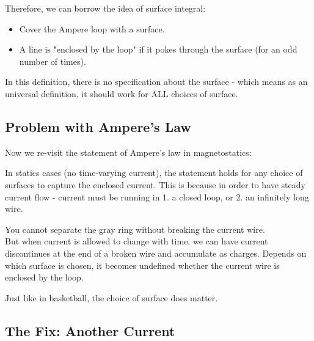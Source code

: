 \documentclass[class=article, crop=false, 12pt]{standalone}
\begin{document}
Therefore, we can borrow the idea of surface integral:
\begin{itemize}
    \item Cover the Ampere loop with a surface.
    \item A line is "enclosed by the loop" if it pokes through the surface (for an odd number of times).
\end{itemize}

In this definition, there is no specification about the surface -
which means as an universal definition, 
it should work for ALL choices of surface.



\subsection{Problem with Ampere's Law}

Now we re-visit the statement of Ampere's law in magnetostatics:

In statics cases (no time-varying current), 
the statement holds for any choice of surfaces to capture the enclosed current.
This is because in order to have steady current flow - 
current must be running in 1. a closed loop, 
or 2. an infinitely long wire.


You cannot separate the gray ring without breaking the current wire.\\

But when current is allowed to change with time, 
we can have current discontinues at the end of a broken wire and accumulate as charges.
Depends on which surface is chosen, 
it becomes undefined whether the current wire is enclosed by the loop.


Just like in basketball, the choice of surface does matter.






\subsection{The Fix: Another Current}
\end{document}
